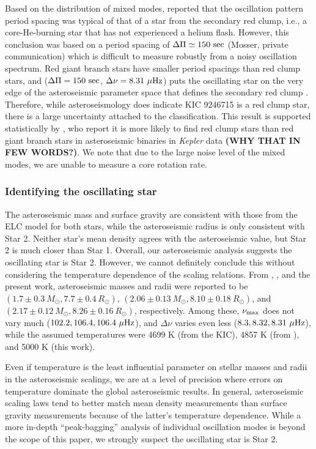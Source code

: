 Based on the distribution of mixed modes, \citet{gau14} reported that the oscillation pattern period spacing was typical of that of a star from the secondary red clump, i.e., a core-He-burning star that has not experienced a helium flash. However, this conclusion was based on a period spacing of $\Delta \Pi \simeq 150 \ \rm{sec}$ (Mosser, private communication) which is difficult to measure robustly from a noisy oscillation spectrum. Red giant branch stars have smaller period spacings than red clump stars, and ($\Delta \Pi = 150 \ \rm{sec}$, $\Delta \nu = 8.31 \ \mu \rm{Hz}$) puts the oscillating star on the very edge of the asteroseismic parameter space that defines the secondary red clump \citep{mos14}. Therefore, while asteroseismology does indicate KIC 9246715 is a red clump star, there is a large uncertainty attached to the classification. This result is supported statistically by \citet{mig14}, who report it is more likely to find red clump stars than red giant branch stars in asteroseismic binaries in \emph{Kepler} data {\textbf{(WHY THAT IN FEW WORDS?)}}. We note that due to the large noise level of the mixed modes, we are unable to measure a core rotation rate.

\subsubsection{Identifying the oscillating star}
The asteroseismic mass and surface gravity are consistent with those from the ELC model for both stars, while the asteroseismic radius is only consistent with Star 2. Neither star's mean density agrees with the asteroseismic value, but Star 2 is much closer than Star 1. Overall, our asteroseismic analysis suggests the oscillating star is Star 2. However, we cannot definitely conclude this without considering the temperature dependence of the scaling relations. From \citet{gau13}, \citet{gau14}, and the present work, asteroseismic masses and radii were reported to be $(1.7 \pm 0.3 \ M_\odot, 7.7 \pm 0.4 \ R_\odot)$, $(2.06 \pm 0.13 \ M_\odot, 8.10 \pm 0.18 \ R_\odot)$, and $(2.17 \pm 0.12 \ M_\odot, 8.26 \pm 0.16 \ R_\odot)$, respectively. Among these, $\nu_{\rm{max}}$ does not vary much ($102.2, 106.4, 106.4 \ \mu\rm{Hz}$), and $\Delta \nu$ varies even less ($8.3, 8.32, 8.31 \ \mu\rm{Hz}$), while the assumed temperatures were 4699 K (from the KIC), 4857 K (from \citealt{hub14.2}), and 5000 K (this work).

Even if temperature is the least influential parameter on stellar masses and radii in the asteroseismic scalings, we are at a level of precision where errors on temperature dominate the global asteroseismic results. In general, asteroseismic scaling laws tend to better match mean density measurements than surface gravity measurements because of the latter's temperature dependence. While a more in-depth ``peak-bagging'' analysis of individual oscillation modes is beyond the scope of this paper, we strongly suspect the oscillating star is Star 2.


